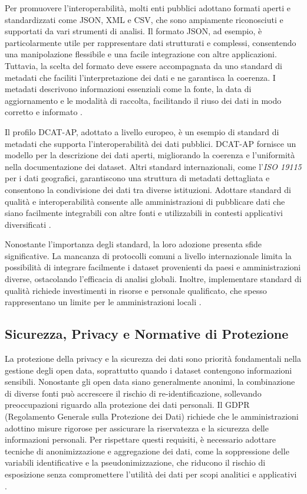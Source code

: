 Per promuovere l’interoperabilità, molti enti pubblici adottano formati aperti e standardizzati come JSON, XML e CSV, che sono ampiamente riconosciuti e supportati da vari strumenti di analisi. Il formato JSON, ad esempio, è particolarmente utile per rappresentare dati strutturati e complessi, consentendo una manipolazione flessibile e una facile integrazione con altre applicazioni. Tuttavia, la scelta del formato deve essere accompagnata da uno standard di metadati che faciliti l’interpretazione dei dati e ne garantisca la coerenza. I metadati descrivono informazioni essenziali come la fonte, la data di aggiornamento e le modalità di raccolta, facilitando il riuso dei dati in modo corretto e informato \cite{ComuneBologna2023}.

Il profilo DCAT-AP, adottato a livello europeo, è un esempio di standard di metadati che supporta l'interoperabilità dei dati pubblici. DCAT-AP fornisce un modello per la descrizione dei dati aperti, migliorando la coerenza e l’uniformità nella documentazione dei dataset. Altri standard internazionali, come l’\textit{ISO 19115} per i dati geografici, garantiscono una struttura di metadati dettagliata e consentono la condivisione dei dati tra diverse istituzioni. Adottare standard di qualità e interoperabilità consente alle amministrazioni di pubblicare dati che siano facilmente integrabili con altre fonti e utilizzabili in contesti applicativi diversificati \cite{Smith2018}.

Nonostante l’importanza degli standard, la loro adozione presenta sfide significative. La mancanza di protocolli comuni a livello internazionale limita la possibilità di integrare facilmente i dataset provenienti da paesi e amministrazioni diverse, ostacolando l’efficacia di analisi globali. Inoltre, implementare standard di qualità richiede investimenti in risorse e personale qualificato, che spesso rappresentano un limite per le amministrazioni locali \cite{OpenDataCharter}.

\subsection{Sicurezza, Privacy e Normative di Protezione}

La protezione della privacy e la sicurezza dei dati sono priorità fondamentali nella gestione degli open data, soprattutto quando i dataset contengono informazioni sensibili. Nonostante gli open data siano generalmente anonimi, la combinazione di diverse fonti può accrescere il rischio di re-identificazione, sollevando preoccupazioni riguardo alla protezione dei dati personali. Il GDPR (Regolamento Generale sulla Protezione dei Dati) richiede che le amministrazioni adottino misure rigorose per assicurare la riservatezza e la sicurezza delle informazioni personali. Per rispettare questi requisiti, è necessario adottare tecniche di anonimizzazione e aggregazione dei dati, come la soppressione delle variabili identificative e la pseudonimizzazione, che riducono il rischio di esposizione senza compromettere l’utilità dei dati per scopi analitici e applicativi \cite{GDPR2016}.


